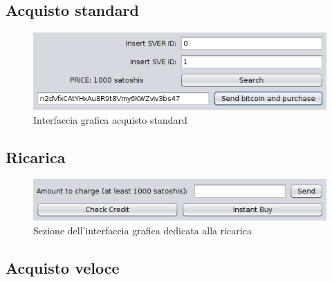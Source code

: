 \subsection{Acquisto standard}

\begin{figure}[h!t]
\centerline{\includegraphics[width=\textwidth]{img/gui-standard-buy}}
\caption{Interfaccia grafica acquisto standard}
\label{f:integr:gui-standard-buy}
\end{figure}

\subsection{Ricarica}

\begin{figure}[h!t]
\centerline{\includegraphics[width=\textwidth]{img/gui-recharge}}
\caption{Sezione dell'interfaccia grafica dedicata alla ricarica}
\label{f:integr:gui-recharge}
\end{figure}

\subsection{Acquisto veloce}


